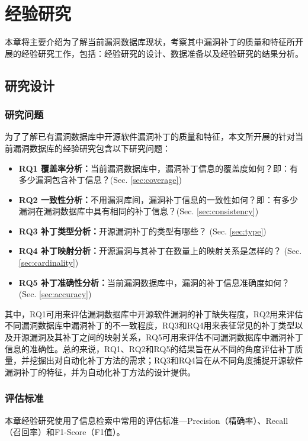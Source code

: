 \chapter{经验研究}\label{sec:study}

本章将主要介绍为了解当前漏洞数据库现状，考察其中漏洞补丁的质量和特征所开展的经验研究工作，包括：经验研究的设计、数据准备以及经验研究的结果分析。


\section{研究设计}
\subsection{研究问题}
为了了解已有漏洞数据库中开源软件漏洞补丁的质量和特征，本文所开展的针对当前漏洞数据库的经验研究包含以下研究问题：

\begin{itemize}[leftmargin=*]
    \item \textbf{RQ1 覆盖率分析：}当前漏洞数据库中，漏洞补丁信息的覆盖度如何？即：有多少漏洞包含补丁信息？(Sec. \ref{sec:coverage})
    \item \textbf{RQ2 一致性分析：}不用漏洞库间，漏洞补丁信息的一致性如何？即：有多少漏洞在漏洞数据库中具有相同的补丁信息？(Sec. \ref{sec:consistency})
    \item \textbf{RQ3 补丁类型分析：}开源漏洞补丁的类型有哪些？ (Sec. \ref{sec:type})
    \item \textbf{RQ4 补丁映射分析：}开源漏洞与其补丁在数量上的映射关系是怎样的？ (Sec. \ref{sec:cardinality})
    \item \textbf{RQ5 补丁准确性分析：}当前漏洞数据库中，漏洞的补丁信息准确度如何？ (Sec. \ref{sec:accuracy})
\end{itemize}
    
其中，RQ1可用来评估漏洞数据库中开源软件漏洞的补丁缺失程度，RQ2用来评估不同漏洞数据库中漏洞补丁的不一致程度，RQ3和RQ4用来表征常见的补丁类型以及开源漏洞及其补丁之间的映射关系，RQ5可用来评估不同漏洞数据库中漏洞补丁信息的准确性。总的来说，RQ1、RQ2和RQ5的结果旨在从不同的角度评估补丁质量，并挖掘出对自动化补丁方法的需求；RQ3和RQ4旨在从不同角度捕捉开源软件漏洞补丁的特征，并为自动化补丁方法的设计提供。

\subsection{评估标准}\label{sec:metric}
本章经验研究使用了信息检索中常用的评估标准---Precision（精确率）、Recall（召回率）和F1-Score（F1值）。

